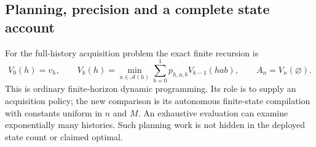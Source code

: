 \subsection{Planning, precision and a complete state account}
For the full-history acquisition problem the exact finite recursion is
\begin{equation}\label{eq:acquisitionbellman}
 V_0(h)=v_h,\qquad
 V_k(h)=\min_{a\in\mathcal A(h)}\sum_{b=0}^1p_{h,a,b}V_{k-1}(hab),
 \qquad A_n=V_n(\varnothing).
\end{equation}
This is ordinary finite-horizon dynamic programming. Its role is to supply an acquisition policy; the new comparison is its autonomous finite-state compilation with constants uniform in $n$ and $M$. An exhaustive evaluation can examine exponentially many histories. Such planning work is not hidden in the deployed state count or claimed optimal.

